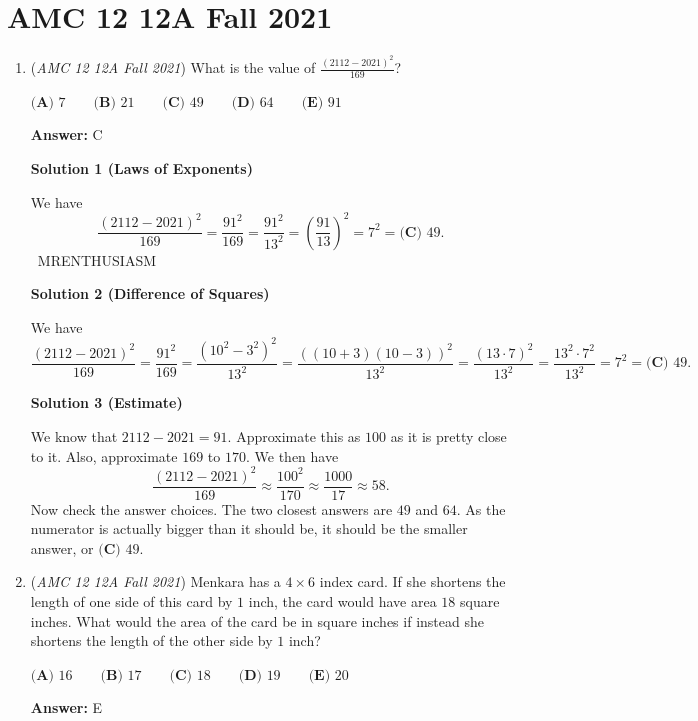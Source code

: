 \section{AMC 12 12A Fall 2021}
        \begin{enumerate}
        	\item (\textit{AMC 12 12A Fall 2021}) What is the value of $\frac{(2112-2021)^2}{169}$?


 $\textbf{(A) } 7 \qquad\textbf{(B) } 21 \qquad\textbf{(C) } 49 \qquad\textbf{(D) } 64 \qquad\textbf{(E) } 91$

 \textbf{Answer: }C



\textbf{Solution 1 (Laws of Exponents)}

We have
 \[\frac{(2112-2021)^2}{169}=\frac{91^2}{169}=\frac{91^2}{13^2}=\left(\frac{91}{13}\right)^2=7^2=\boxed{\textbf{(C) } 49}.\]~MRENTHUSIASM

 



\textbf{Solution 2 (Difference of Squares)}

We have
 \[\frac{(2112-2021)^2}{169}=\frac{91^2}{169}=\frac{(10^2-3^2)^2}{13^2}=\frac{((10+3)(10-3))^2}{13^2}=\frac{(13\cdot7)^2}{13^2}=\frac{13^2 \cdot 7^2}{13^2}=7^2=\boxed{\textbf{(C) } 49}.\]




\textbf{Solution 3 (Estimate)}

We know that $2112-2021 = 91$. Approximate this as $100$ as it is pretty close to it. Also, approximate $169$ to $170$. We then have 
 \[\frac{(2112 - 2021)^2}{169} \approx \frac{100^2}{170} \approx \frac{1000}{17} \approx 58.\]Now check the answer choices. The two closest answers are $49$ and $64$. As the numerator is actually bigger than it should be, it should be the smaller answer, or $\boxed{\textbf{(C) } 49}$.

 


	\item (\textit{AMC 12 12A Fall 2021}) Menkara has a $4 \times 6$ index card. If she shortens the length of one side of this card by $1$ inch, the card would have area $18$ square inches. What would the area of the card be in square inches if instead she shortens the length of the other side by $1$ inch?


 $\textbf{(A) }16\qquad\textbf{(B) }17\qquad\textbf{(C) }18\qquad\textbf{(D) }19\qquad\textbf{(E) }20$

 \textbf{Answer: }E




\end{enumerate}
